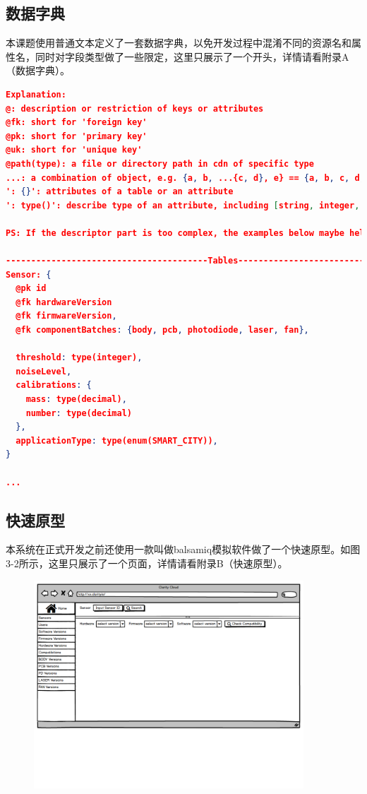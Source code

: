 \subsection{数据字典}
本课题使用普通文本定义了一套数据字典，以免开发过程中混淆不同的资源名和属性名，同时对字段类型做了一些限定，这里只展示了一个开头，详情请看附录A（数据字典）。
\begin{lstlisting}[language={JSON}, caption={版本管理模块的数据字典}]
Explanation:
@: description or restriction of keys or attributes
@fk: short for 'foreign key'
@pk: short for 'primary key'
@uk: short for 'unique key'
@path(type): a file or directory path in cdn of specific type
...: a combination of object, e.g. {a, b, ...{c, d}, e} == {a, b, c, d, e}
': {}': attributes of a table or an attribute
': type()': describe type of an attribute, including [string, integer, decimal, enum]

PS: If the descriptor part is too complex, the examples below maybe helpful.

----------------------------------------Tables-------------------------------------------
Sensor: {
  @pk id
  @fk hardwareVersion
  @fk firmwareVersion,
  @fk componentBatches: {body, pcb, photodiode, laser, fan},

  threshold: type(integer),
  noiseLevel,
  calibrations: {
    mass: type(decimal),
    number: type(decimal)
  },
  applicationType: type(enum(SMART_CITY)),
}

...
\end{lstlisting}

\subsection{快速原型}
本系统在正式开发之前还使用一款叫做balsamiq模拟软件做了一个快速原型。如图3-2所示，这里只展示了一个页面，详情请看附录B（快速原型）。
\begin{figure}[!htp]
 \centering
 \includegraphics[width=0.9\textwidth,page=8]{pdf/balanar_prototype.pdf}
\end{figure}

